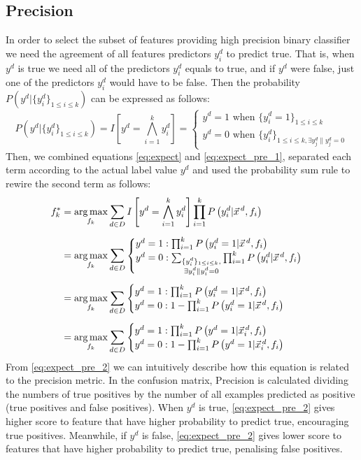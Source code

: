 \subsection{Precision}
In order to select the subset of features providing high precision binary classifier we need the agreement of all features predictors $y^d_i$ to predict true. That is, when $y^d$ is true we need all of the predictors $y^d_i$ equals to true, and if $y^d$ were false, just one of the predictors $y^d_i$ would have to be false. Then the probability $P\left(y^d|\{y^d_i\}_{1\leq i\leq k}\right)$ can be expressed as follows:
\begin{equation}
P\left(y^d|\{y^d_i\}_{1\leq i\leq k}\right)=I\left[y^d=\bigwedge_{i=1}^k y^d_i\right]=
\begin{cases}
	y^d=1 \text{ when } \{y_i^d=1\}_{1\leq i\leq k}\\
	y^d=0 \text{ when } \{y_i^d\}_{1\leq i\leq k,\exists{y_j^d\|y_j^d=0}}
\end{cases}\label{eq:expect_pre_1}
\end{equation}
Then, we combined equations \eqref{eq:expect} and \eqref{eq:expect_pre_1}, separated each term according to the actual label value $y^d$ and used the probability sum rule to rewire the second term as follows:
\begin{align}
f_k^*&=\argmax_{f_k}\sum_{d\in D}I\left[y^d=\bigwedge_{i=1}^k y^d_i\right]\prod_{i=1}^kP\left(y_i^d|\vec{x}^{\,d},f_i\right)\nonumber\\[0.5em]
&=\argmax_{f_k}\sum_{d\in D}
\begin{cases}
	y^d=1: \prod_{i=1}^kP\left(y_i^d=1|\vec{x}^{\,d},f_i\right)\\
	y^d=0: \sum_{\substack{\{y_i^d\}_{1\leq i\leq k},\\ \exists{y_i^d\|y_i^d=0}}}\prod_{i=1}^kP\left(y_i^d|\vec{x}^{\,d},f_i\right)
\end{cases}\nonumber\\[0.5em]
&=\argmax_{f_k}\sum_{d\in D}
\begin{cases}
	y^d=1: \prod_{i=1}^kP\left(y_i^d = 1|\vec{x}^{\,d},f_i\right)\\
	y^d=0: 1-\prod_{i=1}^kP\left(y_i^d = 1|\vec{x}^{\,d},f_i\right)
\end{cases}\label{eq:expect_pre_2}\\[0.5em]
&=\argmax_{f_k}\sum_{d\in D}
\begin{cases}
	y^d=1: \prod_{i=1}^kP\left(y^d = 1|\vec{x}_i^{\,d},f_i\right)\\
	y^d=0: 1-\prod_{i=1}^kP\left(y^d = 1|\vec{x}_i^{\,d},f_i\right)\nonumber
\end{cases}
\end{align}
From \eqref{eq:expect_pre_2} we can intuitively describe how this equation is related to the precision metric. In the confusion matrix, Precision is calculated dividing the numbers of true positives by the number of all examples predicted as positive (true positives and false positives). When $y^d$ is true, \eqref{eq:expect_pre_2} gives higher score to feature that have higher probability to predict true, encouraging true positives. Meanwhile, if $y^d$ is false, \eqref{eq:expect_pre_2} gives lower score to features that have higher probability to predict true, penalising false positives.

